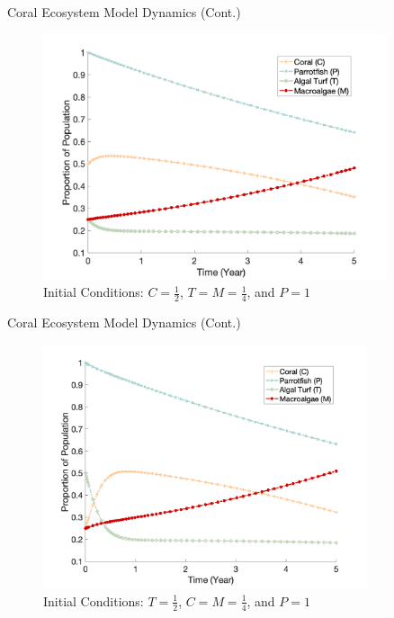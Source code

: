 \documentclass{beamer}
\begin{document}
\begin{frame}{Coral Ecosystem Model Dynamics (Cont.)}
    \begin{figure}
        \centering
        \includegraphics[width=0.9\textwidth]{Latex/Figures/0.5C_0.25T_0.25M.png}
        \caption{Initial Conditions: $C = \frac{1}{2}$, $T = M = \frac{1}{4}$, and $P = 1$}
        \label{fig:coral_dominant}
    \end{figure}
\end{frame}

\begin{frame}{Coral Ecosystem Model Dynamics (Cont.)}
    \begin{figure}
        \centering
        \includegraphics[width=0.85\textwidth]{Latex/Figures/0.25C_0.5T_0.25M.png}
        \caption{Initial Conditions: $T = \frac{1}{2}$, $C = M = \frac{1}{4}$, and $P = 1$}
        \label{fig:turf_dominant}
    \end{figure}
\end{frame}
\end{document}
